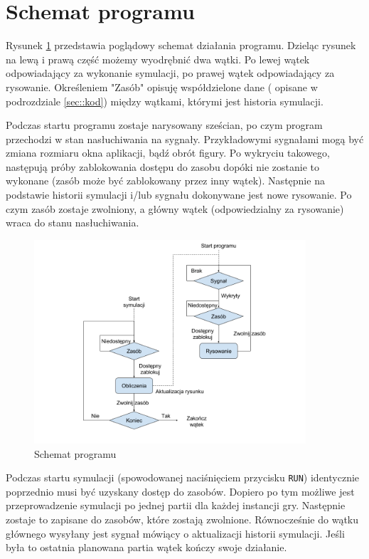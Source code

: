 
\section{Schemat programu}
\label{sec::schemat}
Rysunek \ref{fig:schemat} przedstawia poglądowy schemat działania programu. Dzieląc rysunek na lewą i prawą część możemy wyodrębnić dwa wątki. Po lewej wątek odpowiadający za wykonanie symulacji, po prawej wątek odpowiadający za rysowanie. Określeniem "Zasób" opisuję współdzielone dane ( opisane w podrozdziale \ref{sec::kod}) między wątkami, którymi jest historia symulacji. 

Podczas startu programu zostaje narysowany sześcian, po czym program przechodzi w stan nasłuchiwania na sygnały. Przykładowymi sygnałami mogą być zmiana rozmiaru okna aplikacji, bądź obrót figury. Po wykryciu takowego, następują próby zablokowania dostępu do zasobu dopóki nie zostanie to wykonane (zasób może być zablokowany przez inny wątek). Następnie na podstawie historii symulacji i/lub sygnału dokonywane jest nowe rysowanie. Po czym zasób zostaje zwolniony, a główny wątek (odpowiedzialny za rysowanie) wraca do stanu nasłuchiwania. 
\begin{figure}
    \centering
    \includegraphics[width=0.9\textwidth]{pict/schemat.png}   
    \caption{Schemat programu}
	\label{fig:schemat} 
\end{figure}
Podczas startu symulacji (spowodowanej naciśnięciem przycisku \texttt{RUN}) identycznie poprzednio musi być uzyskany dostęp do zasobów. Dopiero po tym możliwe jest przeprowadzenie symulacji po jednej partii dla każdej instancji gry. Następnie zostaje to zapisane do zasobów, które zostają zwolnione. Równocześnie do wątku głównego wysyłany jest sygnał mówiący o aktualizacji historii symulacji. Jeśli była to ostatnia planowana partia wątek kończy swoje działanie.

